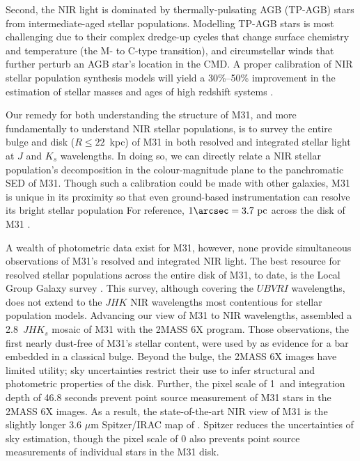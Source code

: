 \documentclass[iop]{emulateapj}
\newcommand{\eg}{\textit{e.g.,~}}
\begin{document}
Second, the NIR light is dominated by thermally-pulsating AGB (TP-AGB) stars from intermediate-aged stellar populations.
Modelling TP-AGB stars is most challenging due to their complex dredge-up cycles that change surface chemistry and temperature (the M- to C-type transition), and circumstellar winds that further perturb an AGB star's location in the CMD.
A proper calibration of NIR stellar population synthesis models \cite[\eg][Charlot \& Bruzual in prep.]{Maraston:2005} will yield a 30\%--50\% improvement in the estimation of stellar masses and ages of high redshift systems \citep[\eg][]{Maraston:2006,Bruzual:2007,Conroy:2010b,Conroy:2013}.

Our remedy for both understanding the structure of M31, and more fundamentally to understand NIR stellar populations, is to survey the entire bulge and disk ($R \leq 22$~kpc) of M31 in both resolved and integrated stellar light at $J$ and $K_s$ wavelengths.
In doing so, we can directly relate a NIR stellar population's decomposition in the colour-magnitude plane to the panchromatic SED of M31.
Though such a calibration could be made with other galaxies, M31 is unique in its proximity so that even ground-based instrumentation can resolve its bright stellar population
For reference, $1\arcsec = 3.7~\mathrm{pc}$ across the disk of M31 \citep[we adopt $D_\mathrm{M31} = 785$~kpc,][]{McConnachie:2005}.

A wealth of photometric data exist for M31, however, none provide simultaneous observations of M31's resolved and integrated NIR light.
The best resource for resolved stellar populations across the entire disk of M31, to date, is the Local Group Galaxy survey \cite[LGGS,][]{Williams:2003,Massey:2006}.
This survey, although covering the $UBVRI$ wavelengths, does not extend to the $JHK$ NIR wavelengths most contentious for stellar population models.
Advancing our view of M31 to NIR wavelengths, \cite{Beaton:2007} assembled a 2.8\arcdeg\ $JHK_s$ mosaic of M31 with the 2MASS 6X program.
Those observations, the first nearly dust-free of M31's stellar content, were used by \cite{Athanassoula:2006} as evidence for a bar embedded in a classical bulge.
Beyond the bulge, the 2MASS 6X images have limited utility; sky uncertainties restrict their use to infer structural and photometric properties of the disk.
Further, the pixel scale of 1\arcsec\ and integration depth of 46.8 seconds prevent point source measurement of M31 stars in the 2MASS 6X images.
As a result, the state-of-the-art NIR view of M31 is the slightly longer 3.6 $\mu$m Spitzer/IRAC map of \cite{Barmby:2006}.
Spitzer reduces the uncertainties of sky estimation, though the pixel scale of 0 also prevents point source measurements of individual stars in the M31 disk.
\end{document}
